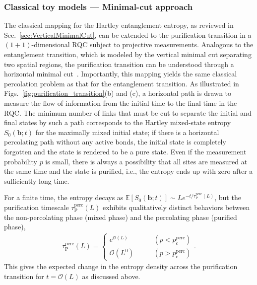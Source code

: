 \documentclass[preprint,pteplogo]{ptephy_v2}%
\numberwithin{equation}{section}
\theoremstyle{definition}
\begin{document}
\subsubsection{Classical toy models --- Minimal-cut approach}
\label{sec:HorizontalMinumalCut}

The classical mapping for the Hartley entanglement entropy, as reviewed in Sec.~\ref{sec:VerticalMinimalCut}, can be extended to the purification transition in a $(1+1)$-dimensional RQC subject to projective measurements.
Analogous to the entanglement transition, which is modeled by the vertical minimal cut separating two spatial regions, the purification transition can be understood through a horizontal minimal cut~\cite{Skinner23lecture, nahum21measurement}.
Importantly, this mapping yields the same classical percolation problem as that for the entanglement transition.
As illustrated in Figs.~\ref{fig:purification_transition}(b) and (c), a horizontal path is drawn to measure the flow of information from the initial time to the final time in the RQC. 
The minimum number of links that must be cut to separate the initial and final states by such a path corresponds to the Hartley mixed-state entropy $S_0(\bm{b};\!t)$ for the maximally mixed initial state;
if there is a horizontal percolating path without any active bonds, the initial state is completely forgotten and the state is rendered to be a pure state.
Even if the measurement probability $p$ is small, there is always a possibility that all sites are measured at the same time and the state is purified, i.e., the entropy ends up with zero after a sufficiently long time.

For a finite time, the entropy decays as $\mathbb{E}[S_0(\bm{b};t)]\sim Le^{-t/\tau_\mathrm{P}^{\mathrm{perc}}(L)}$, but the purification timescale $\tau_\mathrm{P}^{\mathrm{perc}}(L)$ exhibits qualitatively distinct behaviors between the non-percolating phase (mixed phase) and the percolating phase (purified phase),
\begin{align}
    \tau_\mathrm{P}^{\mathrm{perc}}(L)=
    \left\{
    \begin{array}{ll}
    e^{\mathcal{O}(L)} \qquad &(p < p^{\mathrm{perc}}_c) \\
    \mathcal{O}(L^0) \qquad &(p > p^{\mathrm{perc}}_c)
    \end{array}
\right..
\end{align}
This gives the expected change in the entropy density across the purification transition for $t= \mathcal{O}(L)$ as discussed above.
\end{document}
